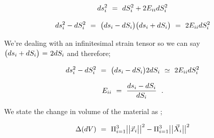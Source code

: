 \documentclass{article}
\begin{document}
\begin{equation} \label{eq:1}
ds_{i}^{2} \hspace{0.125cm} = \hspace{0.125cm} dS_{i}^{2} + 2 E_{i i} dS_{i}^{2}
\end{equation} 

\begin{equation} \label{eq:1}
ds_{i}^{2} - dS_{i}^{2} \hspace{0.125cm} = \hspace{0.125cm} \big( ds_i - dS_i \big) \big( ds_i + dS_i \big) \hspace{0.125cm} = \hspace{0.125cm} 2 E_{i i} dS_{i}^{2}
\end{equation} 

We're dealing with an infinitesimal strain tensor so we can say \begin{math} \big( ds_i + dS_i \big)  \hspace{0.025cm} = \hspace{0.025cm} 2 dS_i \end{math} and therefore;

\begin{equation} \label{eq:1}
ds_{i}^{2} - dS_{i}^{2} \hspace{0.125cm} = \hspace{0.125cm} \big( ds_i - dS_i \big)  2 dS_i \hspace{0.125cm} \simeq \hspace{0.125cm} 2 E_{i i} dS_{i}^{2}
\end{equation} 

\begin{equation} \label{eq:1}
E_{i i} \hspace{0.125cm} = \hspace{0.125cm} \frac{ds_i - dS_i}{dS_i} \hspace{0.225cm} .
\end{equation} 

We state the change in volume of the material as ;

\begin{equation} \label{eq:1}
 \Delta ( dV ) \hspace{0.125cm} = \hspace{0.125cm} \Pi_{i \hspace{0.005cm} = \hspace{0.005cm} 1}^{3} \big| \big| \vec{x}_i \big| \big|^2 - \Pi_{i \hspace{0.005cm} = \hspace{0.005cm} 1}^{3} \big| \big| \vec{X}_i \big| \big|^2
\end{equation} 
\end{document}
